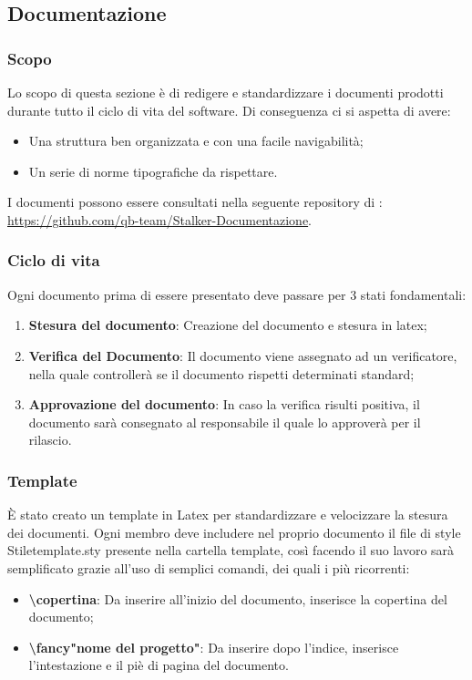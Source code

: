 \subsection{Documentazione}
\subsubsection{Scopo}
Lo scopo di questa sezione è di redigere e standardizzare i documenti prodotti durante tutto il ciclo di vita del software. 
Di conseguenza ci si aspetta di avere:
\begin{itemize}
\item Una struttura ben organizzata e con una facile navigabilità;
\item Un serie di norme tipografiche da rispettare.
\end{itemize}
I documenti possono essere consultati nella seguente repository di : \url{https://github.com/qb-team/Stalker-Documentazione}.

\subsubsection{Ciclo di vita}
Ogni documento prima di essere presentato deve passare per 3 stati fondamentali:
\begin{enumerate}
\item \textbf{Stesura del documento}: Creazione del documento e stesura in latex;
\item \textbf{Verifica del Documento}: Il documento viene assegnato ad un verificatore, nella quale controllerà se il documento rispetti determinati standard;
\item \textbf{Approvazione del documento}: In caso la verifica risulti positiva, il documento sarà consegnato al responsabile il quale lo approverà per il rilascio.
\end{enumerate}

\subsubsection{Template}
È stato creato un template in Latex per standardizzare e velocizzare la stesura dei documenti.
Ogni membro deve includere nel proprio documento il file di style Stiletemplate.sty presente nella cartella template, così facendo il suo lavoro sarà semplificato grazie all'uso di semplici comandi, dei quali i più ricorrenti:
\begin{itemize}
\item \textbf{\textbackslash copertina{}}: Da inserire all'inizio del documento, inserisce la copertina del documento;
\item \textbf{\textbackslash fancy"nome del progetto"{}}: Da inserire dopo l'indice, inserisce l'intestazione e il piè di pagina del documento.
\end{itemize}

